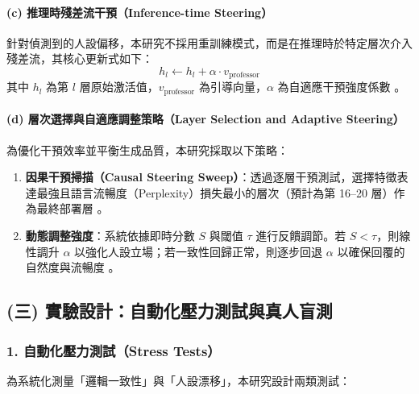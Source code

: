 \paragraph{(c) 推理時殘差流干預（Inference-time Steering）}
針對偵測到的人設偏移，本研究不採用重訓練模式，而是在推理時於特定層次介入殘差流，其核心更新式如下：
\begin{equation}
    h_l \leftarrow h_l + \alpha \cdot v_{\text{professor}}
\end{equation}
其中 $h_l$ 為第 $l$ 層原始激活值，$v_{\text{professor}}$ 為引導向量，$\alpha$ 為自適應干預強度係數 \citep{turner-etal-2023-activation-addition}。

\paragraph{(d) 層次選擇與自適應調整策略（Layer Selection and Adaptive Steering）}
為優化干預效率並平衡生成品質，本研究採取以下策略：
\begin{enumerate}
    \item \textbf{因果干預掃描（Causal Steering Sweep）}：透過逐層干預測試，選擇特徵表達最強且語言流暢度（Perplexity）損失最小的層次（預計為第 16--20 層）作為最終部署層 \citep{a2507_21509v3_personavectors}。
    \item \textbf{動態調整強度}：系統依據即時分數 $S$ 與閾值 $\tau$ 進行反饋調節。若 $S < \tau$，則線性調升 $\alpha$ 以強化人設立場；若一致性回歸正常，則逐步回退 $\alpha$ 以確保回覆的自然度與流暢度 \citep{wehner-etal-2025-representation-engineering}。
\end{enumerate}

\subsection*{(三) 實驗設計：自動化壓力測試與真人盲測}
\subsubsection*{1. 自動化壓力測試（Stress Tests）}
為系統化測量「邏輯一致性」與「人設漂移」，本研究設計兩類測試：

